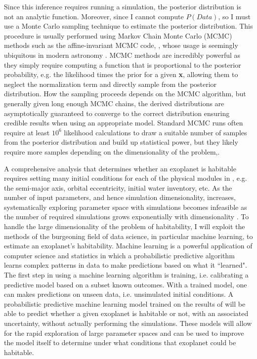 Since this inference requires running a \vplanet simulation, the posterior distribution is not an analytic function. Moreover, since I cannot compute $P(Data)$, so I must use a Monte Carlo sampling technique to estimate the posterior distribution. This procedure is usually performed using Markov Chain Monte Carlo (MCMC) methods such as the affine-invariant MCMC code, \emcee, whose usage is seemingly ubiquitous in modern astronomy \citep{ForemanMackey2013}. MCMC methods are incredibly powerful as they simply require computing a function that is proportional to the posterior probability, e.g. the likelihood times the prior for a given \textbf{x}, allowing them to neglect the normalization term and directly sample from the posterior distribution. How the sampling proceeds depends on the MCMC algorithm, but generally given long enough MCMC chains, the derived distributions are asymptotically guaranteed to converge to the correct distribution ensuring credible results when using an appropriate model. Standard MCMC runs often require at least $10^6$ likelihood calculations to draw a suitable number of samples from the posterior distribution and build up statistical power, but they likely require more samples depending on the dimensionality of the problem,.

A comprehensive analysis that determines whether an exoplanet is habitable requires setting many initial conditions for each of the physical modules in \vplanet, e.g. the semi-major axis, orbital eccentricity, initial water inventory, etc.  As the number of input parameters, and hence simulation dimensionality, increases, systematically exploring parameter space with simulations becomes infeasible as the number of required simulations grows exponentially with dimensionality \citep{Bellman1957}.  To handle the large dimensionality of the problem of habitability, I will exploit the methods of the burgeoning field of data science, in particular machine learning, to estimate an exoplanet's habitability.  Machine learning is a powerful application of computer science and statistics in which a probabilistic predictive algorithm learns complex patterns in data to make predictions based on what it ``learned". The first step in using a machine learning algorithm is training, i.e. calibrating a predictive model based on a subset known outcomes.  With a trained model, one can makes predictions on unseen data, i.e. unsimulated initial conditions.  A probabilistic predictive machine learning model trained on the results of \vplanet will be able to predict whether a given exoplanet is habitable or not, with an associated uncertainty, without actually performing the simulations.  These models will allow for the rapid exploration of large parameter spaces and can be used to improve the model itself to determine under what conditions that exoplanet could be habitable. 

